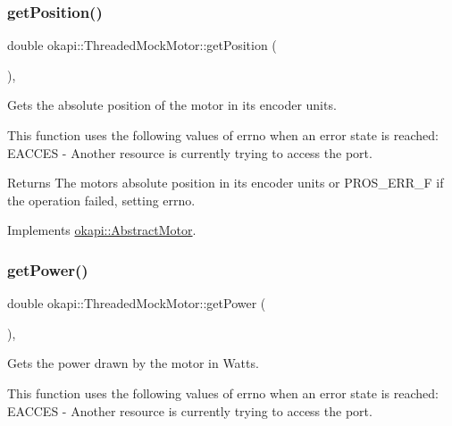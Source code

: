 \subsubsection{\texorpdfstring{getPosition()}{getPosition()}}
{\footnotesize\ttfamily double okapi\+::\+Threaded\+Mock\+Motor\+::get\+Position (\begin{DoxyParamCaption}{ }\end{DoxyParamCaption})\hspace{0.3cm}{\ttfamily [override]}, {\ttfamily [virtual]}}



Gets the absolute position of the motor in its encoder units. 

This function uses the following values of errno when an error state is reached\+: E\+A\+C\+C\+ES -\/ Another resource is currently trying to access the port.

\begin{DoxyReturn}{Returns}
The motor\textquotesingle{}s absolute position in its encoder units or P\+R\+O\+S\+\_\+\+E\+R\+R\+\_\+F if the operation failed, setting errno. 
\end{DoxyReturn}


Implements \mbox{\hyperlink{classokapi_1_1AbstractMotor_a4f9d74e054600c5ddb49ebb8164004d3}{okapi\+::\+Abstract\+Motor}}.

\mbox{\label{classokapi_1_1ThreadedMockMotor_ab55461a1fefd150480f5bf165ff07589}} 
\subsubsection{\texorpdfstring{getPower()}{getPower()}}
{\footnotesize\ttfamily double okapi\+::\+Threaded\+Mock\+Motor\+::get\+Power (\begin{DoxyParamCaption}{ }\end{DoxyParamCaption})\hspace{0.3cm}{\ttfamily [override]}, {\ttfamily [virtual]}}



Gets the power drawn by the motor in Watts. 

This function uses the following values of errno when an error state is reached\+: E\+A\+C\+C\+ES -\/ Another resource is currently trying to access the port.

